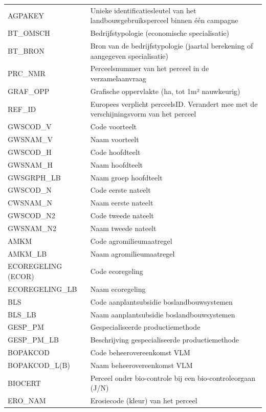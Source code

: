 {\begin{xltabular}{\textwidth}{@{} >{\raggedright\arraybackslash}l >{\raggedright\arraybackslash}X @{}}
        AGPAKEY & Unieke identificatiesleutel van het landbouwgebruiksperceel binnen één campagne \\
        BT\_OMSCH & Bedrijfstypologie (economische specialisatie) \\
        BT\_BRON & Bron van de bedrijfstypologie (jaartal berekening of aangegeven specialisatie) \\
        PRC\_NMR & Perceelsnummer van het perceel in de verzamelaanvraag \\
        GRAF\_OPP & Grafische oppervlakte (ha, tot 1m² nauwkeurig) \\
        REF\_ID & Europees verplicht perceelsID. Verandert mee met de verschijningsvorm van het perceel \\
        GWSCOD\_V & Code voorteelt \\
        GWSNAM\_V & Naam voorteelt \\
        GWSCOD\_H & Code hoofdteelt \\
        GWSNAM\_H & Naam hoofdteelt \\
        GWSGRPH\_LB & Naam groep hoofdteelt \\
        GWSCOD\_N & Code eerste nateelt \\
        CWSNAM\_N & Naam eerste nateelt \\
        GWSCOD\_N2 & Code tweede nateelt \\
        GWSNAM\_N2 & Naam tweede nateelt \\
        AMKM & Code agromilieumaatregel \\
        AMKM\_LB & Naam agromilieumaatregel \\
        ECOREGELING (ECOR) & Code ecoregeling \\
        ECOREGELING\_LB & Naam ecoregeling \\
        BLS & Code aanplantsubsidie boslandbouwsystemen \\
        BLS\_LB & Naam aanplantsubsidie boslandbouwsystemen \\
        GESP\_PM & Gespecialiseerde productiemethode \\
        GESP\_PM\_LB & Beschrijving gespecialiseerde productiemethode \\
        BOPAKCOD & Code beheerovereenkomst VLM \\
        BOPAKCOD\_L(B) & Naam beheerovereenkomst VLM \\
        BIOCERT & Perceel onder bio-controle bij een bio-controleorgaan (J/N) \\
        ERO\_NAM & Erosiecode (kleur) van het perceel \\

\end{xltabular}}
